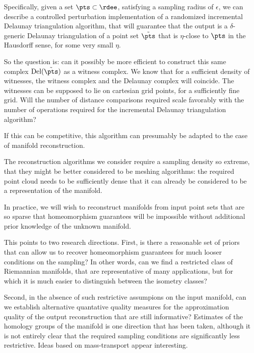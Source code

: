 Specifically, given a set $\pts \subset \rdee$, satisfying a sampling
radius of $\epsilon$, we can describe a
controlled perturbation implementation of a randomized incremental
Delaunay triangulation algorithm, that will guarantee that the output
is a $\delta$-generic Delaunay triangulation of a point set
$\tilde{\pts}$ that is $\eta$-close to $\pts$ in the Hausdorff sense,
for some very small $\eta$. 

So the question is: can it possibly be more efficient to construct
this same complex $\text{Del}(\tilde{\pts})$ as a witness complex. We
know that for a sufficient density of witnesses, the witness complex
and the Delaunay complex will coincide. The witnesses can be supposed
to lie on cartesian grid points, for a sufficiently fine grid. Will
the number of distance comparisons required scale favorably with the
number of operations required for the incremental Delaunay
triangulation algorithm?

If this can be competitive, this algorithm can presumably be adapted
to the case of manifold reconstruction.

%

The reconstruction algorithms we consider require a sampling density
so extreme, that they might be better considered to be meshing
algorithms: the required point cloud needs to be sufficiently dense
that it can already be considered to be a representation of the
manifold.

In practice, we will wish to reconstruct manifolds from input point
sets that are so sparse that homeomorphism guarantees will be
impossible without additional prior knowledge of the unknown
manifold. 

This points to two research directions. First, is there a reasonable
set of priors that can allow us to recover homeomorphism guarantees
for much looser conditions on the sampling? In other words, can we
find a restricted class of Riemannian manifolds, that are
representative of many applications, but for which it is much easier
to distinguish between the isometry classes?

Second, in the absence of such restrictive assumpions on the input
manifold, can we establish alternative quantative quality measures for
the approximation quality of the output reconstruction that are still
informative? Estimates of the homology groups of the manifold is one
direction that has been taken, although it is not entirely clear that
the required sampling conditions are significantly less
restrictive. Ideas based on mass-transport appear interesting.



